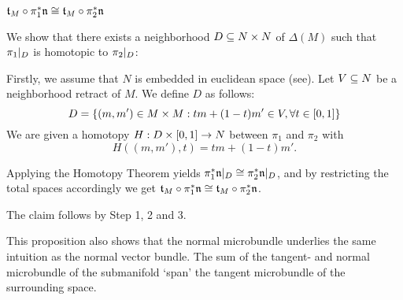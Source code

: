\begin{myproof}
\begin{steps}
        \item $\mathfrak{t}_M \circ \pi_1^*\mathfrak{n} \cong \mathfrak{t}_M \circ \pi_2^*\mathfrak{n}$
        
        We show that there exists a neighborhood $D \subseteq{} N \times N$ of $\Delta(M)$ such that
        $\pi_1\vert_{D}$ is homotopic to $\pi_2\vert_{D}$:

        Firstly, we assume that $N$ is embedded in euclidean space (see\cite[p.60]{dimension}).
        Let $V \subseteq{} N$ be a neighborhood retract of $M$.
        We define $D$ as follows:
        \[ D = \{(m, m') \in M \times M: tm + (1 - t)m' \in V, \forall t \in [0, 1]\} \]
        We are given a homotopy $H: D \times{} [0, 1] \to N$ between $\pi_1$ and $\pi_2$ with
        \[ H((m, m'), t) = tm + (1 - t)m'. \]

        Applying the Homotopy Theorem yields $\pi_1^*\mathfrak{n}\vert_{D} \cong \pi_2^*\mathfrak{n}\vert_{D}$, and
        by restricting the total spaces accordingly we get
        $\mathfrak{t}_M \circ \pi_1^*\mathfrak{n} \cong \mathfrak{t}_M \circ \pi_2^*\mathfrak{n}$.
    \end{steps}
    The claim follows by Step 1, 2 and 3.
\end{myproof}

\begin{myparagraph}
    This proposition also shows that the normal microbundle
    underlies the same intuition as the normal vector bundle. 
    The sum of the tangent- and normal microbundle of the submanifold
    `span' the tangent microbundle of the surrounding space.
\end{myparagraph}